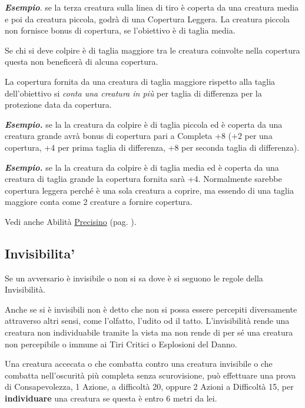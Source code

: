 \begin{multicols}{2}
\textbf{\textit{Esempio}}. se la terza creatura sulla linea di tiro è coperta da una creatura media e poi da creatura piccola, godrà di una Copertura Leggera. La creatura piccola non fornisce bonus di copertura, se l'obiettivo è di taglia media.

Se chi si deve colpire è di taglia maggiore tra le creatura coinvolte nella copertura questa non beneficerà di alcuna copertura.

La copertura fornita da una creatura di taglia maggiore rispetto alla taglia dell'obiettivo si \emph{conta una creatura in più} per taglia di differenza per la protezione data da copertura.

\textbf{\textit{Esempio.}} se la la creatura da colpire è di taglia piccola ed è coperta da una creatura grande avrà bonus di copertura pari a Completa +8 (+2 per una copertura, +4 per prima taglia di differenza, +8 per seconda taglia di differenza).

\textbf{\textit{Esempio.}} se la la creatura da colpire è di taglia media ed è coperta da una creatura di taglia grande la copertura fornita sarà +4. Normalmente sarebbe copertura leggera perché è una sola creatura a coprire, ma essendo di una taglia maggiore conta come 2 creature a fornire copertura.

Vedi anche Abilità \hyperlink{Precisino}{Precisino} (pag. \pageref{Precisino}).


\subsection{Invisibilita'} \hypertarget{invisibilita}{}\label{invisibilita}

Se un avversario è invisibile o non si sa dove è si seguono le regole della Invisibilità.

Anche se si è invisibili non è detto che non si possa essere percepiti diversamente attraverso altri sensi, come l'olfatto, l'udito od il tatto. L'invisibilità rende una creatura non individuabile tramite la vista ma non rende di per sé una creatura non percepibile o immune ai Tiri Critici o Esplosioni del Danno.

Una creatura accecata o che combatta contro una creatura invisibile o che combatta nell'oscurità più completa senza scurovisione, può effettuare una prova di Consapevolezza, 1 Azione, a difficoltà 20, oppure 2 Azioni a Difficoltà 15, per \textbf{individuare} una creatura se questa è entro 6 metri da lei.


\end{multicols}
